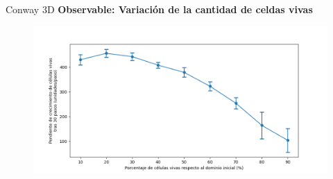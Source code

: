 
\begin{frame}{Conway 3D}
    \textbf{Observable: Variación de la cantidad de celdas vivas}
    \begin{figure}[H]
        \centering
        \includegraphics[width=0.8\linewidth]{pic/conway3d/size_slope_vs_input}
        \label{fig:conway3d:size_slope:density}
    \end{figure}
\end{frame}

